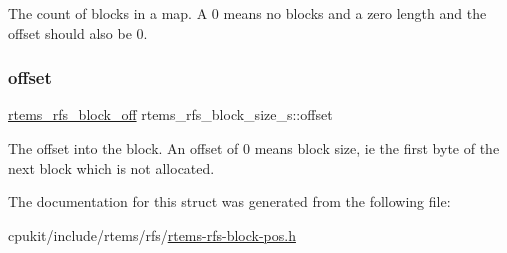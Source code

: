 The count of blocks in a map. A 0 means no blocks and a zero length and the offset should also be 0. \mbox{\label{structrtems__rfs__block__size__s_a80dc690adcf9d6affab46f6d061e2158}} 
\subsubsection{\texorpdfstring{offset}{offset}}
{\footnotesize\ttfamily \mbox{\hyperlink{rtems-rfs-block-pos_8h_ad32ba1f9be3b667fe3e778d0edfdfff3}{rtems\+\_\+rfs\+\_\+block\+\_\+off}} rtems\+\_\+rfs\+\_\+block\+\_\+size\+\_\+s\+::offset}

The offset into the block. An offset of 0 means block size, ie the first byte of the next block which is not allocated. 

The documentation for this struct was generated from the following file\+:\begin{DoxyCompactItemize}
\item 
cpukit/include/rtems/rfs/\mbox{\hyperlink{rtems-rfs-block-pos_8h}{rtems-\/rfs-\/block-\/pos.\+h}}\end{DoxyCompactItemize}
